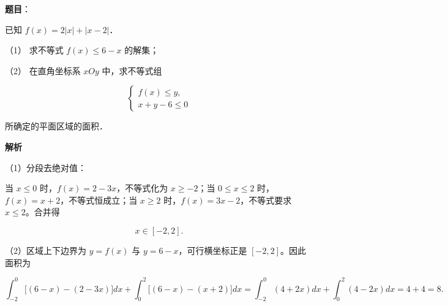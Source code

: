 \begin{answer}

\textbf{题目}：

已知 $f(x)=2|x|+|x-2|$．

（1） 求不等式 $f(x)\leqslant6-x$ 的解集；

（2） 在直角坐标系 $xOy$ 中，求不等式组

\nopagebreak[4]
\[
\begin{cases}
f(x)\leqslant y,\\
x+y-6\leqslant0
\end{cases}
\]

所确定的平面区域的面积．

\textbf{解析}


（1）分段去绝对值：

当 $x\leqslant0$ 时，$f(x)=2-3x$，不等式化为 $x\geqslant-2$；当 $0\leqslant x\leqslant2$ 时，$f(x)=x+2$，不等式恒成立；当 $x\geqslant2$ 时，$f(x)=3x-2$，不等式要求 $x\leqslant2$。合并得

\nopagebreak[4]
\[
x\in[-2,2].
\]


（2）区域上下边界为 $y=f(x)$ 与 $y=6-x$，可行横坐标正是 $[-2,2]$。因此面积为

\nopagebreak[4]
\[
\int_{-2}^0\big[(6-x)-(2-3x)\big]dx+
\int_0^2\big[(6-x)-(x+2)\big]dx
=\int_{-2}^0(4+2x)dx+\int_0^2(4-2x)dx=4+4=8.
\]



\end{answer}